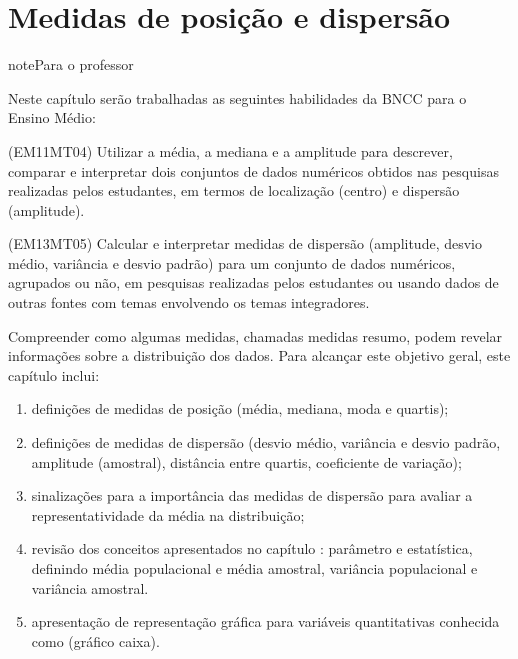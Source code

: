 \chapter{Medidas de posição e dispersão}
\label{\detokenize{PE104:medidas-de-posicao-e-dispersao}}\label{\detokenize{PE104::doc}}
\begin{sphinxadmonition}{note}{Para o professor}

Neste capítulo serão trabalhadas as seguintes habilidades da BNCC para o Ensino Médio:

(EM11MT04) Utilizar a média, a mediana e a amplitude para descrever, comparar e interpretar dois conjuntos de dados numéricos obtidos nas pesquisas realizadas pelos estudantes, em termos de localização (centro) e dispersão (amplitude).

(EM13MT05) Calcular e interpretar medidas de dispersão (amplitude, desvio médio, variância e desvio padrão) para um conjunto de dados numéricos, agrupados ou não, em pesquisas realizadas pelos estudantes ou usando dados de outras fontes com temas envolvendo os temas integradores.


Compreender como algumas medidas, chamadas medidas resumo, podem revelar informações sobre a distribuição dos dados. Para alcançar este objetivo geral, este capítulo inclui:
\begin{enumerate}
\item {} 
definições de medidas de posição (média, mediana, moda e quartis);

\item {} 
definições de medidas de dispersão (desvio médio, variância e desvio padrão, amplitude (amostral), distância entre quartis, coeficiente de variação);

\item {} 
sinalizações para a importância das medidas de dispersão para avaliar a representatividade da média na distribuição;

\item {} 
revisão dos conceitos apresentados no capítulo : parâmetro e estatística, definindo média populacional e média amostral, variância populacional e variância amostral.

\item {} 
apresentação de representação gráfica para variáveis quantitativas conhecida como  (gráfico caixa).

\end{enumerate}


\end{sphinxadmonition}
